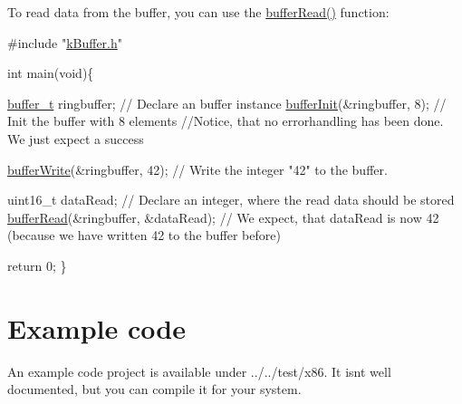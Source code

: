 To read data from the buffer, you can use the \hyperlink{k_buffer_8c_a9b80be9033ccd6b5a101f811520ab4cc}{buffer\+Read()} function\+: 
\begin{DoxyCode}
\textcolor{preprocessor}{#include "\hyperlink{k_buffer_8h}{kBuffer.h}"}

\textcolor{keywordtype}{int} main(\textcolor{keywordtype}{void})\{

 \hyperlink{structbuffer__t}{buffer\_t} ringbuffer;                \textcolor{comment}{// Declare an buffer instance}
 \hyperlink{k_buffer_8c_aec18d6ea571b1326dbeb7ca15f4969c0}{bufferInit}(&ringbuffer, 8);         \textcolor{comment}{// Init the buffer with 8 elements}
 \textcolor{comment}{//Notice, that no errorhandling has been done. We just expect a success}
 
 \hyperlink{k_buffer_8c_a9d6410a89adf65a3ef12340ecb9bbd55}{bufferWrite}(&ringbuffer, 42);       \textcolor{comment}{// Write the integer "42" to the buffer.}

 uint16\_t dataRead;                  \textcolor{comment}{// Declare an integer, where the read data should be stored}
 \hyperlink{k_buffer_8c_a9b80be9033ccd6b5a101f811520ab4cc}{bufferRead}(&ringbuffer, &dataRead); \textcolor{comment}{// We expect, that dataRead is now 42 (because we have
       written 42 to the buffer before)}

 \textcolor{keywordflow}{return} 0;
\}
\end{DoxyCode}
 \hypertarget{index_example}{}\section{Example code}\label{index_example}
An example code project is available under ../../test/x86. It isn\textquotesingle{}t well documented, but you can compile it for your system. 